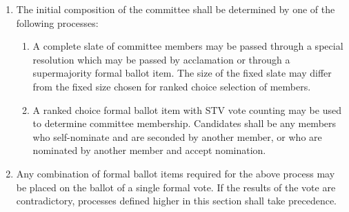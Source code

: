 \documentclass[11pt]{article}
\newcounter{h1}
\newcounter{h2}[h1]
\newcounter{h3}[h2]
\begin{document}
\begin{enumerate}
\begin{enumerate}
    \begin{enumerate}
      \item Unless the creation of the committee is tied to the expiry of another committee, if a committee's creation is delayed by further than 42 days, it shall no longer be created.  
      \item Time which passes during the delay period shall not count toward limits on the lifespan of a committee.  
    \end{enumerate}
  \end{enumerate}
  \item The initial composition of the committee shall be determined by one of the following processes:  
  \begin{enumerate}
    \item A complete slate of committee members may be passed through a special resolution which may be passed by acclamation or through a supermajority formal ballot item. The size of the fixed slate may differ from the fixed size chosen for ranked choice selection of members.  
    \item A ranked choice formal ballot item with STV vote counting may be used to determine committee membership. Candidates shall be any members who self-nominate and are seconded by another member, or who are nominated by another member and accept nomination.  
  \end{enumerate}
  \item Any combination of formal ballot items required for the above process may be placed on the ballot of a single formal vote. If the results of the vote are contradictory, processes defined higher in this section shall take precedence.
\end{enumerate}

\end{document}
